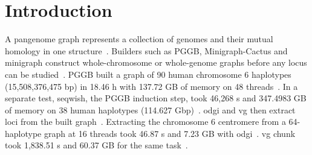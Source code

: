 \section{Introduction}
\label{sec:introduction}

A pangenome graph represents a collection of genomes and their mutual homology in one structure~\citep{CPGC2018pangenomics,Paten2017graphs,Eizenga2020pangenome}.
Builders such as PGGB, Minigraph-Cactus and minigraph construct whole-chromosome or whole-genome graphs before any locus can be studied~\citep{Garrison2024pggb,Hickey2024minigraphcactus,Li2020minigraph}.
PGGB built a graph of 90 human chromosome 6 haplotypes (15,508,376,475 bp) in 18.46 h with 137.72 GB of memory on 48 threads~\citep{Garrison2024pggb}.
In a separate test, seqwish, the PGGB induction step, took 46,268 s and 347.4983 GB of memory on 38 human haplotypes (114.627 Gbp)~\citep{Garrison2023seqwish}.
odgi and vg then extract loci from the built graph~\citep{Guarracino2022odgi,Garrison2018vg}.
Extracting the chromosome 6 centromere from a 64-haplotype graph at 16 threads took 46.87 s and 7.23 GB with odgi~\citep{Guarracino2022odgi}.
vg chunk took 1,838.51 s and 60.37 GB for the same task~\citep{Guarracino2022odgi}.

